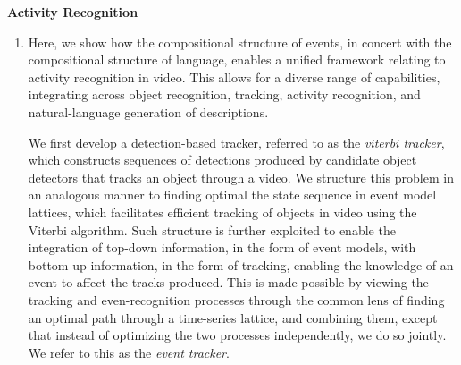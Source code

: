 \documentclass[10pt]{article}
\newenvironment{researchBlock}[1]{%
  \vspace*{0.5ex}
  {\large \textbf{#1}}
  \begin{enumerate}\item[]}
  {\end{enumerate}}
\begin{document}
\begin{researchBlock} {Activity Recognition}

  Here, we show how the compositional structure of events, in concert with the
  compositional structure of language, enables a unified framework relating to
  activity recognition in video.
  This allows for a diverse range of capabilities, integrating across object
  recognition, tracking, activity recognition, and natural-language generation
  of descriptions.

  We first develop a detection-based tracker, referred to as the \emph{viterbi
    tracker}, which constructs sequences of detections produced by candidate
  object detectors that tracks an object through a video.
  We structure this problem in an analogous manner to finding optimal the state
  sequence in event model lattices, which facilitates efficient tracking of
  objects in video using the Viterbi algorithm.
  Such structure is further exploited to enable the integration of top-down
  information, in the form of event models, with bottom-up information, in the
  form of tracking, enabling the knowledge of an event to affect the tracks
  produced.
  This is made possible by viewing the tracking and even-recognition processes
  through the common lens of finding an optimal path through a time-series
  lattice, and combining them, except that instead of optimizing the two
  processes independently, we do so jointly.
  We refer to this as the \emph{event tracker}.


\end{researchBlock}
\end{document}
